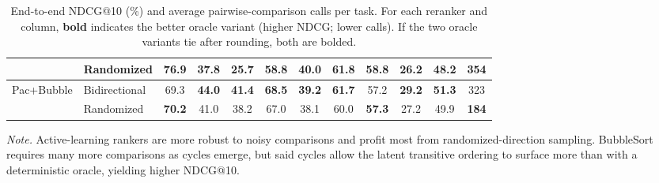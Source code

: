 \documentclass[11pt]{article}
\begin{document}
\begin{table}[!t]
\begin{adjustbox}{max width=\textwidth}
\begin{tabular}{llcccccccccc}
& Randomized
& \textbf{76.9} & \textbf{37.8} & 25.7 & \textbf{58.8} & \textbf{40.0} & 61.8 & \textbf{58.8} & \textbf{26.2} & \textbf{48.2} & \textbf{354} \\
\midrule
\multirow{2}{*}{Pac+Bubble} & Bidirectional
& 69.3 & \textbf{44.0} & \textbf{41.4} & \textbf{68.5} & \textbf{39.2} & \textbf{61.7} & 57.2 & \textbf{29.2} & \textbf{51.3} & 323 \\
& Randomized
& \textbf{70.2} & 41.0 & 38.2 & 67.0 & 38.1 & 60.0 & \textbf{57.3} & 27.2 & 49.9 & \textbf{184} \\
\bottomrule
\end{tabular}
\end{adjustbox}
\caption{
End-to-end NDCG@10 (\%) and average pairwise-comparison calls per task. For each reranker and column, \textbf{bold} indicates the better oracle variant (higher NDCG; lower calls).
If the two oracle variants tie after rounding, both are bolded.
}
\label{tab:reranker_oracle_compare}
\par\vspace{2pt}\footnotesize\noindent\textit{Note.} Active-learning rankers are more robust to noisy comparisons and profit most from randomized-direction sampling. BubbleSort requires many more comparisons as cycles emerge, but said cycles allow the latent transitive ordering to surface more than with a deterministic oracle, yielding higher NDCG@10.

\end{table}
\end{document}
